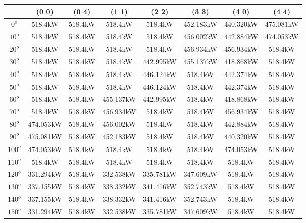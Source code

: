         \singlespacing
        \begin{table}[H]
        	\centering
        	\begin{tabular}{|c|c|c|c|c|c|c|c|} \hline
        			& (0 0)		& (0 4)		& (1 1)		& (2 2)		& (3 3)		& (4 0)		& (4 4)		\\ \hline
        		$0^o$	& 518.4kW	& 518.4kW	& 518.4kW	& 518.4kW	& 452.183kW	& 440.320kW	& 475.081kW	\\ \hline
        		$10^o$	& 518.4kW	& 518.4kW	& 518.4kW	& 518.4kW	& 456.002kW	& 442.884kW	& 474.053kW	\\ \hline
        		$20^o$	& 518.4kW	& 518.4kW	& 518.4kW	& 518.4kW	& 456.934kW	& 456.934kW	& 518.4kW	\\ \hline
        		$30^o$	& 518.4kW	& 518.4kW	& 518.4kW	& 442.995kW	& 455.137kW	& 418.868kW	& 518.4kW	\\ \hline
        		$40^o$	& 518.4kW	& 518.4kW	& 518.4kW	& 446.124kW	& 518.4kW	& 442.374kW	& 518.4kW	\\ \hline
        		$50^o$	& 518.4kW	& 518.4kW	& 518.4kW	& 446.124kW	& 518.4kW	& 442.374kW	& 518.4kW	\\ \hline
        		$60^o$	& 518.4kW	& 518.4kW	& 455.137kW	& 442.995kW	& 518.4kW	& 418.868kW	& 518.4kW	\\ \hline
        		$70^o$	& 518.4kW	& 518.4kW	& 456.934kW	& 518.4kW	& 518.4kW	& 456.934kW	& 518.4kW	\\ \hline
        		$80^o$	& 474.053kW	& 518.4kW	& 456.002kW	& 518.4kW	& 518.4kW	& 442.884kW	& 518.4kW	\\ \hline
        		$90^o$	& 475.081kW	& 518.4kW	& 452.183kW	& 518.4kW	& 518.4kW	& 440.320kW	& 518.4kW	\\ \hline
        		$100^o$	& 474.053kW	& 518.4kW	& 518.4kW	& 518.4kW	& 518.4kW	& 474.053kW	& 518.4kW	\\ \hline
        		$110^o$	& 518.4kW	& 518.4kW	& 518.4kW	& 518.4kW	& 518.4kW	& 518.4kW	& 518.4kW	\\ \hline
        		$120^o$	& 331.294kW	& 518.4kW	& 332.538kW	& 335.781kW	& 347.609kW	& 518.4kW	& 518.4kW	\\ \hline
        		$130^o$	& 337.155kW	& 518.4kW	& 338.332kW	& 341.416kW	& 352.743kW	& 518.4kW	& 518.4kW	\\ \hline
        		$140^o$	& 337.155kW	& 518.4kW	& 338.332kW	& 341.416kW	& 352.743kW	& 518.4kW	& 518.4kW	\\ \hline
        		$150^o$	& 331.294kW	& 518.4kW	& 332.538kW	& 335.781kW	& 347.609kW	& 518.4kW	& 518.4kW	\\ \hline

\end{tabular}
\end{table}
